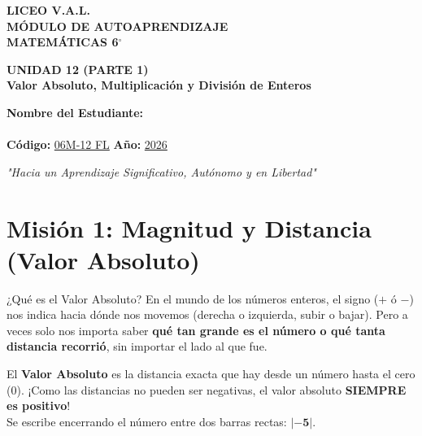 \documentclass[12pt, letterpaper]{article}
\begin{document}
	
	\begin{center}
		\vspace*{1cm}
		{\Huge \textbf{LICEO V.A.L.}}\\[0.5cm]
		{\LARGE \textbf{MÓDULO DE AUTOAPRENDIZAJE}}\\[0.5cm]
		{\Large \textbf{MATEMÁTICAS 6$^\circ$}}\\[0.5cm]
		
		\begin{tcolorbox}[colback=valblue!10, colframe=valblue, arc=3mm, boxrule=1.5pt]
			\centering \Huge \textbf{UNIDAD 12 (PARTE 1)}\\[0.2cm]
			\Large \textbf{Valor Absoluto, Multiplicación y División de Enteros}
		\end{tcolorbox}
		
		\vspace{0.6cm}
		\begin{tcolorbox}[colback=white, colframe=valblue, width=12cm, arc=3mm, boxrule=1.5pt]
			\centering
			\vspace{0.3cm}
			\textbf{Nombre del Estudiante:}\\[0.3cm]
			\underline{\hspace{9cm}}\\[0.5cm]
			\textbf{Código:} \underline{06M-12 FL} \hspace{1cm} \textbf{Año:} \underline{2026}
			\vspace{0.3cm}
		\end{tcolorbox}
		
		\vspace{0.8cm}
		\textit{"Hacia un Aprendizaje Significativo, Autónomo y en Libertad"}
		
		\vspace{0.8cm}

	\end{center}
	
	
	\section*{Misión 1: Magnitud y Distancia (Valor Absoluto)}
	
	\begin{concepto}{¿Qué es el Valor Absoluto?}
		En el mundo de los números enteros, el signo ($+$ ó $-$) nos indica hacia dónde nos movemos (derecha o izquierda, subir o bajar). Pero a veces solo nos importa saber \textbf{qué tan grande es el número o qué tanta distancia recorrió}, sin importar el lado al que fue.
		
		El \textbf{Valor Absoluto} es la distancia exacta que hay desde un número hasta el cero ($0$). ¡Como las distancias no pueden ser negativas, el valor absoluto \textbf{SIEMPRE es positivo}!
		\\Se escribe encerrando el número entre dos barras rectas: $\mathbf{|-5|}$.
	\end{concepto}
	
\end{document}
